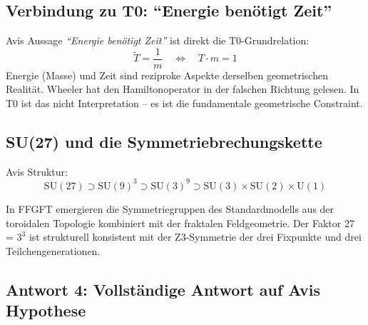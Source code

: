 \documentclass[12pt, a4paper]{article}
\newcommand{\Tfield}{\tilde{T}}
\begin{document}
\subsection{Verbindung zu T0: ``Energie benötigt Zeit''}

Avis Aussage \textit{``Energie benötigt Zeit''} ist direkt die T0-Grundrelation:
\begin{equation}
  \Tfield = \frac{1}{m} \quad \Longleftrightarrow \quad T \cdot m = 1
\end{equation}
Energie (Masse) und Zeit sind reziproke Aspekte derselben geometrischen Realität. Wheeler hat den Hamiltonoperator in der falschen Richtung gelesen. In T0 ist das nicht Interpretation -- es ist die fundamentale geometrische Constraint.

\subsection{SU(27) und die Symmetriebrechungskette}

Avis Struktur:
\begin{equation}
  \text{SU}(27) \supset \text{SU}(9)^3 \supset \text{SU}(3)^9 \supset \text{SU}(3) \times \text{SU}(2) \times \text{U}(1)
\end{equation}

In FFGFT emergieren die Symmetriegruppen des Standardmodells aus der toroidalen Topologie kombiniert mit der fraktalen Feldgeometrie. Der Faktor 27 = $3^3$ ist strukturell konsistent mit der Z3-Symmetrie der drei Fixpunkte und drei Teilchengenerationen.

\subsection{Antwort 4: Vollständige Antwort auf Avis Hypothese}
\end{document}
